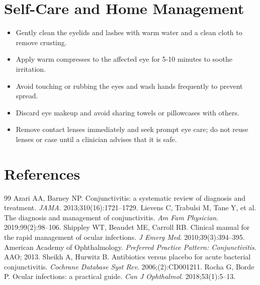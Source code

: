 \section*{Self-Care and Home Management}
\begin{itemize}
  \item Gently clean the eyelids and lashes with warm water and a clean cloth to remove crusting.
  \item Apply warm compresses to the affected eye for 5-10 minutes to soothe irritation.
  \item Avoid touching or rubbing the eyes and wash hands frequently to prevent spread.
  \item Discard eye makeup and avoid sharing towels or pillowcases with others.
  \item Remove contact lenses immediately and seek prompt eye care; do not reuse lenses or case until a clinician advises that it is safe.
\end{itemize}

\section*{References}
\begin{thebibliography}{99}
Azari AA, Barney NP. Conjunctivitis: a systematic review of diagnosis and treatment. \textit{JAMA}. 2013;310(16):1721--1729.
Lievens C, Trabulsi M, Tane Y, et al. The diagnosis and management of conjunctivitis. \textit{Am Fam Physician}. 2019;99(2):98--106.
Shippley WT, Beaudet ME, Carroll RB. Clinical manual for the rapid management of ocular infections. \textit{J Emerg Med}. 2010;39(3):394--395.
American Academy of Ophthalmology. \textit{Preferred Practice Pattern: Conjunctivitis}. AAO; 2013.
Sheikh A, Hurwitz B. Antibiotics versus placebo for acute bacterial conjunctivitis. \textit{Cochrane Database Syst Rev}. 2006;(2):CD001211.
Rocha G, Borde P. Ocular infections: a practical guide. \textit{Can J Ophthalmol}. 2018;53(1):5--13.
\end{thebibliography}
